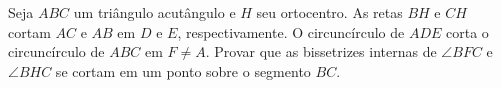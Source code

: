 Seja $ABC$ um triângulo acutângulo e $H$ seu ortocentro.
As retas $BH$ e $CH$ cortam $AC$ e $AB$ em $D$ e $E$, respectivamente.
O circuncírculo de $ADE$ corta o circuncírculo de $ABC$ em $F \neq A$.
Provar que as bissetrizes internas de $\angle BFC$ e $\angle BHC$ se cortam em um ponto sobre o segmento $BC$.